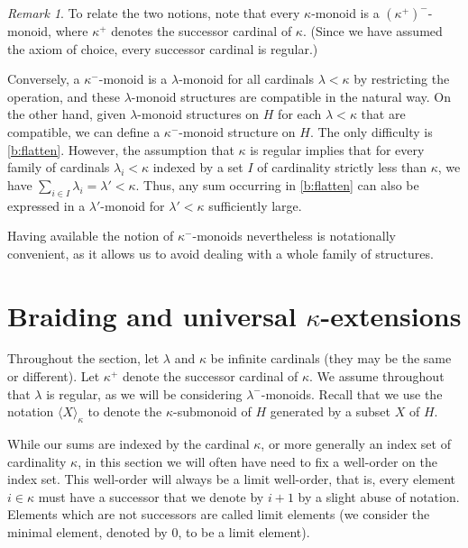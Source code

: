 \documentclass[a4paper,11pt,oneside]{amsart}
\theoremstyle{remark}
\newtheorem{remark}[teor]{Remark}
\begin{document}
\begin{remark}
  To relate the two notions, note that every $\kappa$-monoid is a $(\kappa^+)^{-}$-monoid, where $\kappa^+$ denotes the successor cardinal of $\kappa$. (Since we have assumed the axiom of choice, every successor cardinal is regular.)

  Conversely, a $\kappa^-$-monoid is a $\lambda$-monoid for all cardinals $\lambda < \kappa$ by restricting the operation, and these $\lambda$-monoid structures are compatible in the natural way.
  On the other hand, given $\lambda$-monoid structures on $H$ for each $\lambda < \kappa$ that are compatible, we can define a $\kappa^-$-monoid structure on $H$.
  The only difficulty is \ref{b:flatten}.
  However, the assumption that $\kappa$ is regular implies that for every family of cardinals $\lambda_i < \kappa$ indexed by a set $I$ of cardinality strictly less than $\kappa$, we have $\sum_{i \in I} \lambda_i = \lambda' < \kappa$.
  Thus, any sum occurring in \ref{b:flatten} can also be expressed in a $\lambda'$-monoid for $\lambda' < \kappa$ sufficiently large.

  Having available the notion of $\kappa^-$-monoids nevertheless is notationally convenient, as it allows us to avoid dealing with a whole family of structures.
\end{remark}


\section{Braiding and universal \texorpdfstring{$\kappa$}{κ}-extensions} \label{sec:braiding}

Throughout the section, let $\lambda$ and $\kappa$ be infinite cardinals (they may be the same or different).
Let $\kappa^+$ denote the successor cardinal of $\kappa$.
We assume throughout that $\lambda$ is regular, as we will be considering $\lambda^-$-monoids.
Recall that we use the notation $\langle X \rangle_\kappa$ to denote the $\kappa$-submonoid of $H$ generated by a subset $X$ of $H$.

While our sums are indexed by the cardinal $\kappa$, or more generally an index set of cardinality $\kappa$, in this section we will often have need to fix a well-order on the index set.
This well-order will always be a limit well-order, that is, every element $i \in \kappa$ must have a successor that we denote by $i+1$ by a slight abuse of notation.
Elements which are not successors are called limit elements (we consider the minimal element, denoted by $0$, to be a limit element).
\end{document}
